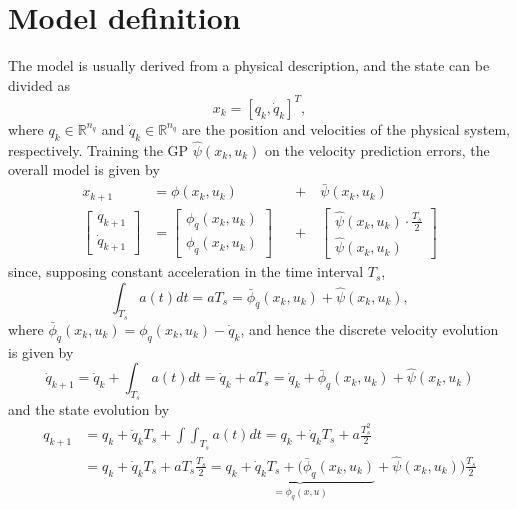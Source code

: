 \documentclass{article}
\begin{document}
\section{Model definition}
The model is usually derived from a physical description, and the state can be divided as
\begin{equation}
    {x}_k = [{q}_k, {\dot{q}}_k]^T,
\end{equation}
where ${q}_k \in \mathbb{R}^{n_q}$ and ${\dot{q}}_k \in \mathbb{R}^{n_q}$ are the position and velocities of the physical system, respectively. Training the GP $\hat{\psi}(x_k, u_k)$ on the velocity prediction errors, the overall model is given by 
\begin{equation}\label{eq:overall_dyn}
\begin{aligned}
     {x}_{k+1} &=  {\phi}( {x}_k, {u}_k) &&+ \quad \bar{ {\psi}}( {x}_k, {u}_k)\\
    \begin{bmatrix}
     {q}_{k+1} \\
     {\dot{q}}_{k+1}
    \end{bmatrix} &= 
    \begin{bmatrix}
     {\phi}_q( {x}_k, {u}_k) \\
     {\phi}_{\dot{q}}( {x}_k, {u}_k)
    \end{bmatrix} 
    &&+ \quad
    \begin{bmatrix}
     {\hat{\psi}}( {x}_k, {u}_k) \cdot \frac{T_s}{2} \\
     {\hat{\psi}}( {x}_k, {u}_k)
    \end{bmatrix} 
    \end{aligned}
\end{equation}
since, supposing constant acceleration in the time interval $ T_s$, 
\begin{equation}
    \int_{ T_s} a(t) dt = a  T_s = \bar{\phi}_{\dot{q}}( {x}_k, {u}_k) + {\hat{\psi}}( {x}_k, {u}_k),
\end{equation}
where $\bar{\phi}_{\dot{q}}( {x}_k, {u}_k) = {\phi}_{\dot{q}}( {x}_k, {u}_k) - \dot{q}_k$, and hence the discrete velocity evolution is given by
\begin{equation}
    \dot{q}_{k+1} = \dot{q}_k + \int_{ T_s} a(t) dt = \dot{q}_k + a  T_s = \dot{q}_k + \bar{\phi}_{\dot{q}}( {x}_k, {u}_k) + {\hat{\psi}}( {x}_k, {u}_k)
\end{equation}
and the state evolution by
\begin{equation}
\begin{aligned}
    {q}_{k+1} &= q_k + \dot{q}_k  T_s + \int \int_{ T_s} a(t) dt = q_k + \dot{q}_k  T_s + a \frac{ T_s^2}{2} \\
    &= q_k + \dot{q}_k  T_s + a  T_s \frac{ T_s}{2} = \underbrace{q_k + \dot{q}_k  T_s + (\bar{\phi}_{\dot{q}}( {x}_k, {u}_k)}_{= \phi_q(x,u)} + {\hat{\psi}}( {x}_k, {u}_k)) \frac{ T_s}{2}
    \end{aligned}
\end{equation}
\end{document}
